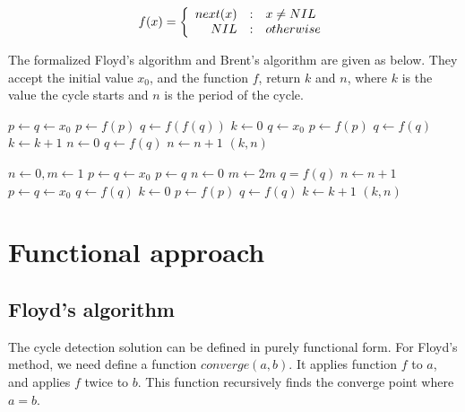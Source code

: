 \documentclass{article}
\begin{document}
\begin{equation}
f(x) = \left \{
  \begin{array}
  {r@{\quad:\quad}l}
  next(x) & x \neq NIL \\
  NIL & otherwise
  \end{array}
\right.
\end{equation}

The formalized Floyd's algorithm and Brent's algorithm are given as below. They accept the initial value
$x_0$, and the function $f$, return $k$ and $n$, where $k$ is the value the cycle starts and $n$ is the
period of the cycle.

\begin{algorithmic}[1]
  \State $p \gets q \gets x_0$ 
  \Repeat
    \State $p \gets f(p)$
    \State $q \gets f(f(q))$
   
  \Statex
  \State $k \gets 0$
  \State $q \gets x_0$ 
   
    \State $p \gets f(p)$
    \State $q \gets f(q)$
    \State $k \gets k + 1$
  \EndWhile
  \Statex
  \State $n \gets 0$
  \Repeat {}
    \State $q \gets f(q)$
    \State $n \gets n + 1$
  \State \Return $(k, n)$
\EndFunction
\end{algorithmic}

\begin{algorithmic}[1]
  \State $n \gets 0, m \gets 1$
  \State $p \gets q \gets x_0$
  \Repeat{}
      \State $p \gets q$ 
      \State $n \gets 0$
      \State $m \gets 2m$
    \EndIf
    \State $q = f(q)$
    \State $n \gets n + 1$
   
  \Statex
  \State $ p \gets q \gets x_0$ 
   
    \State $q \gets f(q)$
  \EndLoop
  \Statex
  \State $k \gets 0$
   
    \State $p \gets f(p)$
    \State $q \gets f(q)$
    \State $k \gets k + 1$
  \EndWhile
  \State \Return $(k, n)$
\EndFunction
\end{algorithmic}

\section{Functional approach}
\subsection{Floyd's algorithm}
The cycle detection solution can be defined in purely functional form. For Floyd's method, we
need define a function $converge(a, b)$. It applies function $f$ to $a$, and applies $f$ twice
to $b$. This function recursively finds the converge point where $a = b$.
\end{document}
